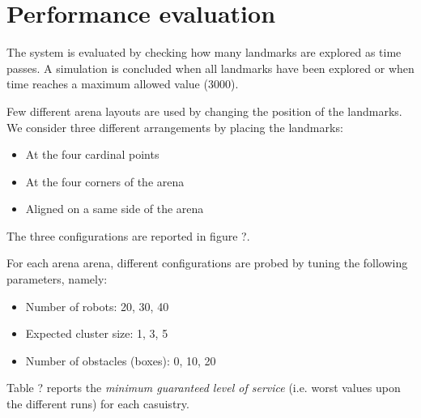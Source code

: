 \chapter{Performance evaluation}

The system is evaluated by checking how many landmarks are explored as time passes. A simulation is concluded when all landmarks have been explored or when time reaches a maximum allowed value (3000).

\bigskip
Few different arena layouts are used by changing the position of the landmarks. We consider three different arrangements by placing the landmarks:

\begin{itemize}

  \item At the four cardinal points
  \item At the four corners of the arena
  \item Aligned on a same side of the arena

\end{itemize}

The three configurations are reported in figure ?. 

\smallskip
For each arena arena, different configurations are probed by tuning the following parameters, namely:

\begin{itemize}

  \item Number of robots: 20, 30, 40
  \item Expected cluster size: 1, 3, 5
  \item Number of obstacles (boxes): 0, 10, 20

\end{itemize}

Table ? reports the \textit{minimum guaranteed level of service} (i.e. worst values upon the different runs) for each casuistry.


